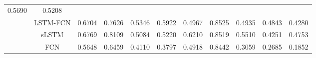 \documentclass{ieeeaccess}
\begin{document}
\begin{table}[htbp!]
\begin{tabular*}{0.9\textwidth}{c|c|c|cccc|cccc}
  \multicolumn{1}{c|}{0.5690} &
  0.5208 \\ \cline{2-11} 
 &
  LSTM-FCN &
  0.6704 &
  \multicolumn{1}{c|}{0.7626} &
  \multicolumn{1}{c|}{0.5346} &
  \multicolumn{1}{c|}{0.5922} &
  0.4967 &
  \multicolumn{1}{c|}{0.8525} &
  \multicolumn{1}{c|}{0.4935} &
  \multicolumn{1}{c|}{0.4843} &
  0.4280 \\ \cline{2-11} 
 &
  sLSTM &
  0.6769 &
  \multicolumn{1}{c|}{0.8109} &
  \multicolumn{1}{c|}{0.5084} &
  \multicolumn{1}{c|}{0.5220} &
  0.6210 &
  \multicolumn{1}{c|}{0.8519} &
  \multicolumn{1}{c|}{0.5510} &
  \multicolumn{1}{c|}{0.4251} &
  0.4753 \\ \cline{2-11} 
 &
  FCN &
  0.5648 &
  \multicolumn{1}{c|}{0.6459} &
  \multicolumn{1}{c|}{0.4110} &
  \multicolumn{1}{c|}{0.3797} &
  0.4918 &
  \multicolumn{1}{c|}{0.8442} &
  \multicolumn{1}{c|}{0.3059} &
  \multicolumn{1}{c|}{0.2685} &
  0.1852 \\ \hline
\end{tabular*}
\end{table}
\end{document}

